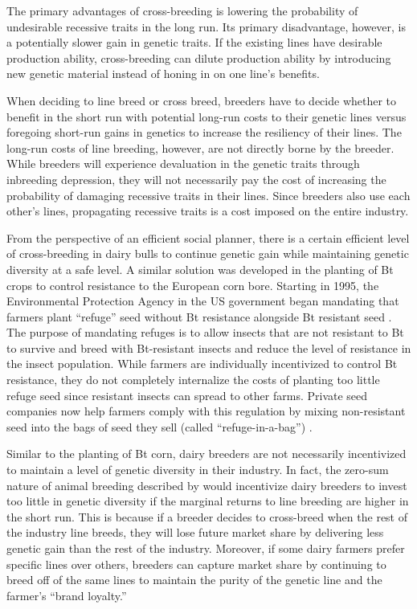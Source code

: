 \documentclass[12pt,letterpaper]{article}
\begin{document}
The primary advantages of cross-breeding is lowering the probability of undesirable recessive traits in the long run.
Its primary disadvantage, however, is a potentially slower gain in genetic traits.
If the existing lines have desirable production ability, cross-breeding can dilute production ability by introducing new genetic material instead of honing in on one line's benefits.

When deciding to line breed or cross breed, breeders have to decide whether to benefit in the short run with potential long-run costs to their genetic lines versus foregoing short-run gains in genetics to increase the resiliency of their lines.
The long-run costs of line breeding, however, are not directly borne by the breeder.
While breeders will experience devaluation in the genetic traits through inbreeding depression, they will not necessarily pay the cost of increasing the probability of damaging recessive traits in their lines.
Since breeders also use each other's lines, propagating recessive traits is a cost imposed on the entire industry.

From the perspective of an efficient social planner, there is a certain efficient level of cross-breeding in dairy bulls to continue genetic gain while maintaining genetic diversity at a safe level.
A similar solution was developed in the planting of Bt crops to control resistance to the European corn bore.
Starting in 1995, the Environmental Protection Agency in the US government began mandating that farmers plant ``refuge'' seed without Bt resistance alongside Bt resistant seed \citep{bourguet2005regulating}. 
The purpose of mandating refuges is to allow insects that are not resistant to Bt to survive and breed with Bt-resistant insects and reduce the level of resistance in the insect population.
While farmers are individually incentivized to control Bt resistance, they do not completely internalize the costs of planting too little refuge seed since resistant insects can spread to other farms.
Private seed companies now help farmers comply with this regulation by mixing non-resistant seed into the bags of seed they sell (called ``refuge-in-a-bag'') \citep{mohan2018refuge}.

Similar to the planting of Bt corn, dairy breeders are not necessarily incentivized to maintain a level of genetic diversity in their industry.
In fact, the zero-sum nature of animal breeding described by \citet{Melton1994} would incentivize dairy breeders to invest too little in genetic diversity if the marginal returns to line breeding are higher in the short run.
This is because if a breeder decides to cross-breed when the rest of the industry line breeds, they will lose future market share by delivering less genetic gain than the rest of the industry.
Moreover, if some dairy farmers prefer specific lines over others, breeders can capture market share by continuing to breed off of the same lines to maintain the purity of the genetic line and the farmer's ``brand loyalty.''
\end{document}
